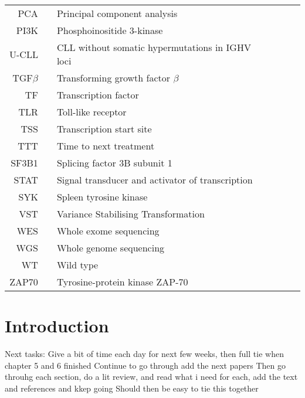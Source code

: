 \documentclass[11pt, a4paper, twosided]{book}
\begin{document}
\begin{tabular}{rp{0.2cm}lp{1cm}rp{0.2cm}l}
    PCA & & Principal component analysis \\
    PI3K & & Phosphoinositide 3-kinase \\
    U-CLL & & CLL without somatic hypermutations in IGHV loci \\
    TGF$\beta$ & & Transforming growth factor $\beta$ \\
    TF & & Transcription factor \\
    TLR & & Toll-like receptor \\ 
    TSS & & Transcription start site \\
    TTT & & Time to next treatment \\
    SF3B1 & & Splicing factor 3B subunit 1 \\
    STAT & & Signal transducer and activator of transcription \\
    SYK & & Spleen tyrosine kinase \\
    VST & & Variance Stabilising Transformation \\
    WES & & Whole exome sequencing \\
    WGS & & Whole genome sequencing \\
    WT & & Wild type \\
    ZAP70 & & Tyrosine-protein kinase ZAP-70 \\

    
   
\end{tabular}
\newpage
\listoffigures
{}

\newpage
\listoftables
{}

\newpage
\pagestyle{plain}
\setcounter{page}{1}    %

\hypertarget{introduction}{%
\chapter{Introduction}\label{introduction}}

Next tasks:
Give a bit of time each day for next few weeks, then full tie when chapter 5 and 6 finished
Continue to go through add the next papers
Then go throuhg each section, do a lit review, and read what i need for each, add the text and references and kkep going
Should then be easy to tie this together
\end{document}
